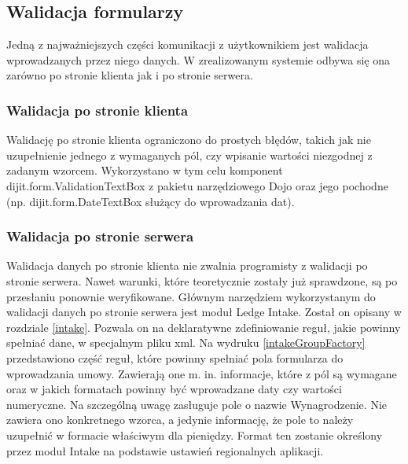 \subsection[Walidacja formularzy][Walidacja formularzy]{Walidacja formularzy}
Jedną z najważniejszych części komunikacji z użytkownikiem jest walidacja wprowadzanych przez niego danych. W zrealizowanym systemie odbywa się ona zarówno po stronie klienta jak i po stronie serwera.

\subsubsection{Walidacja po stronie klienta}
Walidację po stronie klienta ograniczono do prostych błędów, takich jak nie uzupełnienie jednego z wymaganych pól, czy wpisanie wartości niezgodnej z zadanym wzorcem.
Wykorzystano w tym celu komponent dijit.form.ValidationTextBox z pakietu narzędziowego Dojo oraz jego pochodne (np. dijit.form.DateTextBox służący do wprowadzania dat).


\subsubsection{Walidacja po stronie serwera}
Walidacja danych po stronie klienta nie zwalnia programisty z walidacji po stronie serwera. Nawet warunki, które teoretycznie zostały już sprawdzone, są po przesłaniu ponownie weryfikowane. Głównym narzędziem wykorzystanym do walidacji danych po stronie serwera jest moduł Ledge Intake. Został on opisany w rozdziale \ref{intake}. Pozwala on na deklaratywne zdefiniowanie reguł, jakie powinny spełniać dane, w specjalnym pliku xml. Na wydruku \ref{intakeGroupFactory} przedstawiono część reguł, które powinny spełniać pola formularza do wprowadzania umowy. Zawierają one m. in. informacje, które z pól są wymagane oraz w jakich formatach powinny być wprowadzane daty czy wartości numeryczne. Na szczególną uwagę zasługuje pole o nazwie Wynagrodzenie. Nie zawiera ono konkretnego wzorca, a jedynie informację, że pole to należy uzupełnić w formacie właściwym dla pieniędzy. Format ten zostanie określony przez moduł Intake na podstawie ustawień regionalnych aplikacji. 

